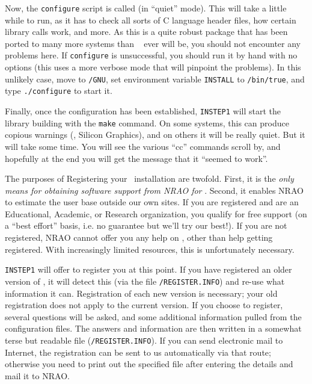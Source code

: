 Now, the {\tt configure} script is called (in ``quiet'' mode).  This
will take a little while to run, as it has to check all sorts of C
language header files, how certain library calls work, and more.  As
this is a quite robust package that has been ported to many more systems
than \AIPS~ ever will be, you should not encounter any problems here.
If {\tt configure} is unsuccessful, you should run it by hand with no
options (this uses a more verbose mode that will pinpoint the problems).
In this unlikely case, move to {\tt\LIBR/GNU}, set environment variable
{\tt INSTALL} to {\tt /bin/true}, and type {\tt ./configure} to start
it.

Finally, once the configuration has been established, {\tt INSTEP1} will
start the library building with the {\tt make} command.  On some
systems, this can produce copious warnings (\eg, Silicon Graphics), and
on others it will be really quiet.  But it will take some time.  You
will see the various ``cc'' commands scroll by, and hopefully at the end
you will get the message that it ``seemed to work''.

\bigskip{}

The purposes of Registering your \AIPS\ installation are twofold.
First, it is the {\it only means for obtaining software support from
NRAO for\/} \AIPS.  Second, it enables NRAO to estimate the user base
outside our own sites.  If you are registered and are an Educational,
Academic, or Research organization, you qualify for free support (on a
``best effort'' basis, i.e. no guarantee but we'll try our best!).  If
you are not registered, NRAO cannot offer you any help on \AIPS, other
than help getting registered.  With increasingly limited resources, this
is unfortunately necessary.

{\tt INSTEP1} will offer to register you at this point.  If you have
registered an older version of \AIPS, it will detect this (via the file
{\tt\AROOT/REGISTER.INFO}) and re-use what information it can.
Registration of each new version is necessary; your old registration
does not apply to the current version.  If you choose to register,
several questions will be asked, and some additional information pulled
from the configuration files.  The answers and information are then
written in a somewhat terse but readable file
({\tt\AROOT/REGISTER.INFO}).  If you can send electronic mail to
Internet, the registration can be sent to us automatically via that
route; otherwise you need to print out the specified file after entering
the details and mail it to NRAO.

